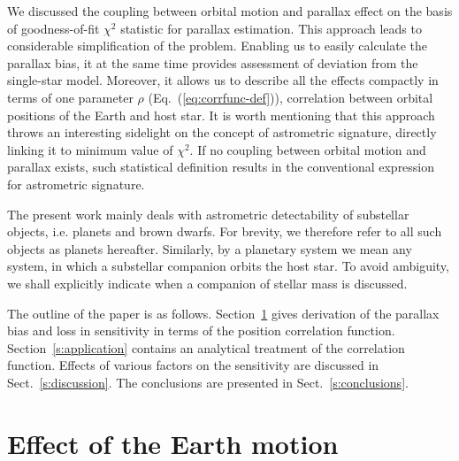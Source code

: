 \documentclass[fleqn,usenatbib,useAMS,usedcolumn]{mnras}
\begin{document}
We discussed the coupling between orbital motion and parallax effect on the basis of goodness-of-fit $\chi^2$ statistic for parallax estimation. This approach leads to considerable simplification of the problem. Enabling us to easily calculate the parallax bias, it at the same time provides assessment of deviation from the single-star model. Moreover, it allows us to describe all the effects compactly in terms of one parameter $\rho$ (Eq.~(\ref{eq:corrfunc-def})), correlation between orbital positions of the Earth and host star. It is worth mentioning that this approach throws an interesting sidelight on the concept of astrometric signature, directly linking it to minimum value of $\chi^2$. If no coupling between orbital motion and parallax exists, such statistical definition results in the conventional expression for astrometric signature.

The present work mainly deals with astrometric detectability of substellar objects, i.e. planets and brown dwarfs. For brevity, we therefore refer to all such objects as planets hereafter. Similarly, by a planetary system we mean any system, in which a substellar companion orbits the host star. To avoid ambiguity, we shall explicitly indicate when a companion of stellar mass is discussed.

The outline of the paper is as follows. Section~\ref{s:earth} gives derivation of the parallax bias and loss in sensitivity in terms of the position correlation function. Section~\ref{s:application} contains an analytical treatment of the correlation function. Effects of various factors on the sensitivity are discussed in Sect.~\ref{s:discussion}. The conclusions are presented in Sect.~\ref{s:conclusions}.

\section{Effect of the Earth motion}\label{s:earth}
\end{document}

